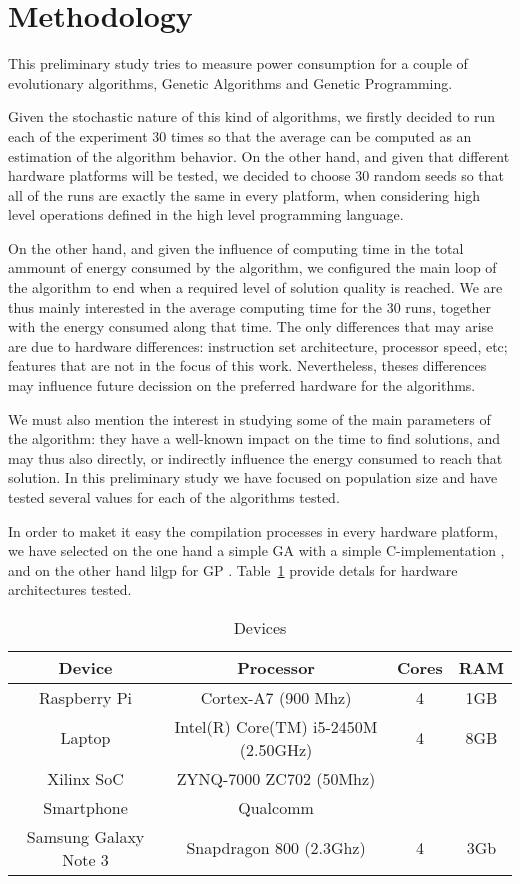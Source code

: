 \section{Methodology}

This preliminary study tries to measure power consumption for a couple of evolutionary algorithms, Genetic Algorithms and Genetic Programming.

Given the stochastic nature of this kind of algorithms, we firstly decided to run each of the experiment 30 times so that the average can be computed as an estimation of the algorithm behavior.  On the other hand, and given that different hardware platforms will be tested, we decided to choose 30 random seeds so that all of the runs are exactly the same in every platform, when considering high level operations defined in the high level programming language.

On the other hand, and given the influence of computing time in the total ammount of energy consumed by the algorithm, we configured the main loop of the algorithm to end when a required level of solution quality is reached. We are thus mainly interested in the average computing time for the 30 runs, together with the energy consumed along that time.  The only differences that may arise are due to hardware differences:  instruction set architecture, processor speed, etc;  features that are not in the focus of this work.  Nevertheless, theses differences may influence future decission on the preferred hardware for the algorithms.  

We must also mention the interest in studying some of the main parameters of the algorithm:  they have a well-known impact on the time to find solutions, and may thus also directly, or indirectly influence the energy consumed to reach that solution.  In this preliminary study we have focused on population size and have tested several values for each of the algorithms tested.

In order to maket it easy the compilation processes in every hardware platform, we have selected on the one hand a simple GA \cite{michalewicz} with a simple C-implementation \cite{web_algoritmo}, and on the other hand lilgp for GP \cite{lilgp}.  Table~\ref{Table:devices} provide detals for hardware architectures tested.

 
\begin{table}
\renewcommand{\arraystretch}{1.3}
\centering
\caption{Devices}
\label{Table:devices}
\begin{tabular}{cccc} \hline
Device&Processor&Cores&RAM\\ \hline
Raspberry Pi& Cortex-A7 (900 Mhz)& 4 &1GB \\
Laptop & Intel(R) Core(TM) i5-2450M (2.50GHz)&4&8GB\\
Xilinx SoC & ZYNQ-7000 ZC702 (50Mhz) & & \\
Smartphone & Qualcomm & & \\
Samsung Galaxy Note 3 & Snapdragon 800 (2.3Ghz) & 4 & 3Gb \\
\hline
\end{tabular}
\end{table}

